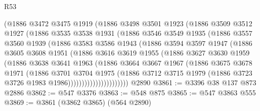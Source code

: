 \begin{lexlean}{R53}
\begin{coremodule}
              (@1886
                @3472
                @3475
                @1919
                (@1886
                  @3498
                  @3501
                  @1923
                  (@1886
                    @3509
                    @3512
                    @1927
                    (@1886
                      @3535
                      @3538
                      @1931
                      (@1886
                        @3546
                        @3549
                        @1935
                        (@1886
                          @3557
                          @3560
                          @1939
                          (@1886
                            @3583
                            @3586
                            @1943
                            (@1886
                              @3594
                              @3597
                              @1947
                              (@1886
                                @3605
                                @3608
                                @1951
                                (@1886
                                  @3616
                                  @3619
                                  @1955
                                  (@1886
                                    @3627
                                    @3630
                                    @1959
                                    (@1886
                                      @3638
                                      @3641
                                      @1963
                                      (@1886
                                        @3664
                                        @3667
                                        @1967
                                        (@1886
                                          @3675
                                          @3678
                                          @1971
                                          (@1886
                                            @3701
                                            @3704
                                            @1975
                                            (@1886
                                              @3712
                                              @3715
                                              @1979
                                              (@1886 @3723 @3726 @1983 @1986))))))))))))))))))))))
    @2890
@3861 := @3396 @38 @137 @873 @2886
@3862 := @547 @3376
@3863 := @548 @875
@3865 := @547 @3863 @555
@3869 := @3861 (@3862 @3865) (@564 @2890)

\end{coremodule}
\end{lexlean}
